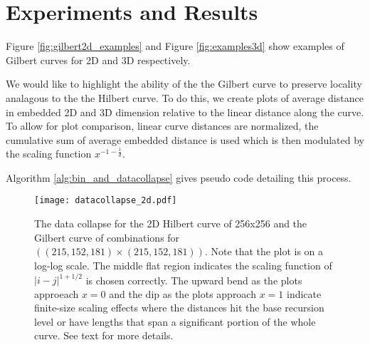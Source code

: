 \section{Experiments and Results}

Figure \ref{fig:gilbert2d_examples} and Figure \ref{fig:examples3d} show examples of Gilbert curves for 2D and 3D respectively.

We would like to highlight the ability of the the Gilbert curve to preserve locality analagous to the the Hilbert curve.
To do this, we create plots of average distance in embedded 2D and 3D dimension relative to the linear distance along the curve.
To allow for plot comparison, linear curve distances are normalized, the cumulative sum of average embedded distance is
used which is then modulated by the scaling function $x^{-1-\frac{1}{d}}$.

Algorithm \ref{alg:bin_and_datacollapse} gives pseudo code detailing this process.


\begin{figure}[h]
  \centering
  \texttt{[image: datacollapse\_2d.pdf]}
  \caption{ The data collapse for the 2D Hilbert curve of 256x256 and the Gilbert curve of combinations for $((215,152,181) \times (215,152,181))$. 
  Note that the plot is on a log-log scale.
  The middle flat region indicates the scaling function of $|i-j|^{1 + 1/2}$ is chosen correctly.
  The upward bend as the plots approeach $x=0$ and the dip as the plots approach $x=1$ indicate finite-size scaling effects where the distances
  hit the base recursion level or have lengths that span a significant portion of the whole curve.
  See text for more details.
  }
  \label{fig:datacollapse_2d}
\end{figure}


